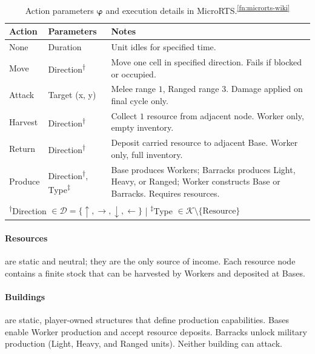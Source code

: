 \begin{table}[!htp]
\caption[Action parameters and execution details]{Action parameters $\boldsymbol{\varphi}$ and execution details in MicroRTS.\textsuperscript{\ref{fn:microrts-wiki}}}
\label{tab:microrts-action-details}
\begin{tabularx}{\textwidth}{llX}
\toprule
\textbf{Action} & \textbf{Parameters} & \textbf{Notes} \\
\midrule
None & Duration & Unit idles for specified time. \\
\midrule
Move & Direction\textsuperscript{†} & Move one cell in specified direction. Fails if blocked or occupied. \\
\midrule
Attack & Target (x, y) & Melee range $1$, Ranged range $3$. Damage applied on final cycle only. \\
\midrule
Harvest & Direction\textsuperscript{†} & Collect $1$ resource from adjacent node. Worker only, empty inventory. \\
\midrule
Return & Direction\textsuperscript{†} & Deposit carried resource to adjacent Base. Worker only, full inventory. \\
\midrule
Produce & Direction\textsuperscript{†}, Type\textsuperscript{‡} & Base produces Workers; Barracks produces Light, Heavy, or Ranged; Worker constructs Base or Barracks. Requires resources. \\
\bottomrule
\multicolumn{3}{p{\textwidth}}{\footnotesize \textsuperscript{†}Direction $\in \mathcal{D} = \{\uparrow, \rightarrow, \downarrow, \leftarrow\}$ \quad | \quad \textsuperscript{‡}Type $\in \mathcal{K} \setminus \{\text{Resource}\}$} \\
\end{tabularx}

\end{table}

\paragraph*{Resources} are static and neutral; they are the only source of income. Each resource node contains a finite stock that can be harvested by Workers and deposited at Bases.

\paragraph*{Buildings} are static, player-owned structures that define production capabilities. Bases enable Worker production and accept resource deposits. Barracks unlock military production (Light, Heavy, and Ranged units). Neither building can attack.

